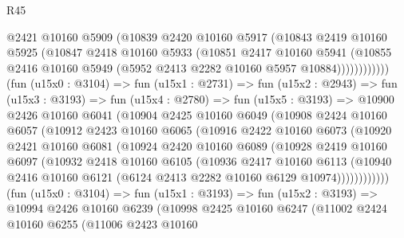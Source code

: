 \begin{lexlean}{R45}
\begin{coremodule}
                    @2421
                    @10160
                    @5909
                    (@10839
                      @2420
                      @10160
                      @5917
                      (@10843
                        @2419
                        @10160
                        @5925
                        (@10847
                          @2418
                          @10160
                          @5933
                          (@10851
                            @2417
                            @10160
                            @5941
                            (@10855
                              @2416
                              @10160
                              @5949
                              (@5952 @2413 @2282 @10160 @5957 @10884))))))))))))
        (fun (u15x0 : @3104) =>
        fun (u15x1 : @2731) =>
        fun (u15x2 : @2943) =>
        fun (u15x3 : @3193) =>
        fun (u15x4 : @2780) =>
        fun (u15x5 : @3193) =>
        @10900
          @2426
          @10160
          @6041
          (@10904
            @2425
            @10160
            @6049
            (@10908
              @2424
              @10160
              @6057
              (@10912
                @2423
                @10160
                @6065
                (@10916
                  @2422
                  @10160
                  @6073
                  (@10920
                    @2421
                    @10160
                    @6081
                    (@10924
                      @2420
                      @10160
                      @6089
                      (@10928
                        @2419
                        @10160
                        @6097
                        (@10932
                          @2418
                          @10160
                          @6105
                          (@10936
                            @2417
                            @10160
                            @6113
                            (@10940
                              @2416
                              @10160
                              @6121
                              (@6124 @2413 @2282 @10160 @6129 @10974))))))))))))
        (fun (u15x0 : @3104) =>
        fun (u15x1 : @3193) =>
        fun (u15x2 : @3193) =>
        @10994
          @2426
          @10160
          @6239
          (@10998
            @2425
            @10160
            @6247
            (@11002
              @2424
              @10160
              @6255
              (@11006
                @2423
                @10160

\end{coremodule}
\end{lexlean}
